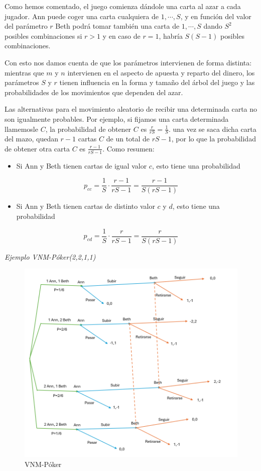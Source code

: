 \documentclass[12pt,a4paper,]{book}
\providecommand{\tightlist}{%
  \setlength{\itemsep}{0pt}\setlength{\parskip}{0pt}}
\numberwithin{dummy}{section}
\theoremstyle{ocrenumbox}
\theoremstyle{blacknumex}
\theoremstyle{blacknumbox}
\theoremstyle{ocrenum}
\theoremstyle{ocrenum}
\begin{document}
Como hemos comentado, el juego comienza dándole una carta al azar a cada
jugador. Ann puede coger una carta cualquiera de \(1,\cdots,S\), y en
función del valor del parámetro \(r\) Beth podrá tomar también una carta
de \(1,\cdots,S\) dando \(S^2\) posibles combinaciones si \(r>1\) y en
caso de \(r = 1\), habría \(S(S-1)\) posibles combinaciones.

Con esto nos damos cuenta de que los parámetros intervienen de forma
distinta: mientras que \(m\) y \(n\) intervienen en el aspecto de
apuesta y reparto del dinero, los parámetros \(S\) y \(r\) tienen
influencia en la forma y tamaño del árbol del juego y las probabilidades
de los movimientos que dependen del azar.

Las alternativas para el movimiento aleatorio de recibir una determinada
carta no son igualmente probables. Por ejemplo, si fijamos una carta
determinada llamemosle \(C\), la probabilidad de obtener \(C\) es
\(\frac{r}{rS}= \frac{1}{S}\). una vez se saca dicha carta del mazo,
quedan \(r-1\) cartas \(C\) de un total de \(rS-1\), por lo que la
probabilidad de obtener otra carta \(C\) es \(\frac{r-1}{rS-1}\). Como
resumen:

\begin{itemize}
\tightlist
\item
  Si Ann y Beth tienen cartas de igual valor \(c\), esto tiene una
  probabilidad
\end{itemize}

\[
p_{cc}=\frac{1}{S} · \frac{r-1}{rS-1}=\frac{r-1}{S(rS-1)}
\]

\begin{itemize}
\tightlist
\item
  Si Ann y Beth tienen cartas de distinto valor \(c\) y \(d\), esto
  tiene una probabilidad
\end{itemize}

\[
p_{cd}=\frac{1}{S} · \frac{r}{rS-1}=\frac{r}{S(rS-1)}
\]

\emph{Ejemplo VNM-Póker(2,2,1,1)}

\begin{figure}[H]

{\centering \includegraphics[width=0.8\linewidth]{Ejemplo_VNM} 

}

\caption{\label{ejemplo_VNM}VNM-Póker}\label{fig:ejemplo_VNM}
\end{figure}
\end{document}
